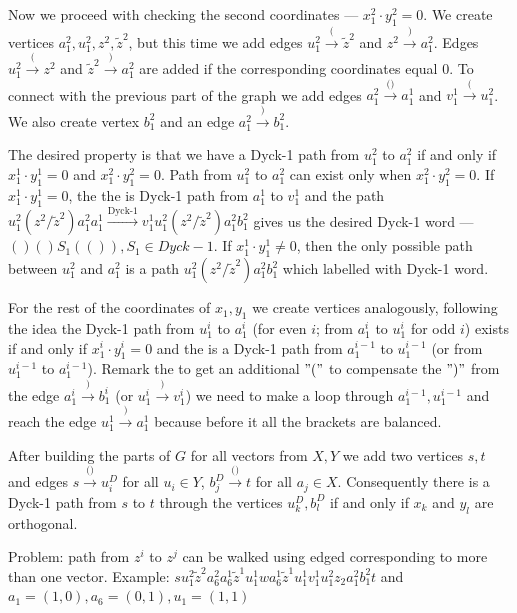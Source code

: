 \documentclass{amsart}
\begin{document}
	Now we proceed with checking the second coordinates --- $x_1^2 \cdot y_1^2 = 0$. We create vertices $a_1^2, u_1^2, z^2, \tilde{z}^2$, but this time we add edges $u_1^2 \xrightarrow{\text{(}} \tilde{z}^2$ and $z^2 \xrightarrow{\text{)}} a_1^2$. Edges $u_1^2 \xrightarrow{\text{(}} z^2$ and $\tilde{z}^2 \xrightarrow{\text{)}} a_1^2$ are added if the corresponding coordinates equal 0. To connect with the previous part of the graph we add edges $a_1^2 \xrightarrow{\text{()}} a_1^1$ and $v_1^1 \xrightarrow{\text{(}} u_1^2$. We also create vertex $b_1^2$ and an edge $a_1^2 \xrightarrow{\text{)}} b_1^2$. 
	
	The desired property is that we have a Dyck-1 path from $u_1^2$ to $a_1^2$ if and only if $x_1^1 \cdot y_1^1 = 0$ and $x_1^2 \cdot y_1^2 = 0$. Path from $u_1^2$ to $a_1^2$ can exist only when $x_1^2 \cdot y_1^2 = 0$. If $x_1^1 \cdot y_1^1 = 0$, the the is Dyck-1 path from $a_1^1$ to $v_1^1$ and the path $u_1^2(z^2/\tilde{z}^2)a_1^2a_1^1 \xrightarrow{\text{Dyck-1}} v_1^1 u_1^2(z^2/\tilde{z}^2)a_1^2b_1^2$ gives us the desired Dyck-1 word --- $()()S_1(()), S_1 \in Dyck-1$. If $x_1^1 \cdot y_1^1 \neq 0$, then the only possible path between $u_1^2$ and $a_1^2$ is a path $u_1^2(z^2/\tilde{z}^2)a_1^2b_1^2$ which labelled with Dyck-1 word.
	
	For the rest of the coordinates of $x_1, y_1$ we create vertices analogously, following the idea the Dyck-1 path from $u_1^i$ to $a_1^i$ (for even $i$; from $a_1^i$ to $u_1^i$ for odd $i$) exists if and only if $x_1^i \cdot y_1^i = 0$ and the is a Dyck-1 path from $a_1^{i - 1}$ to $u_1^{i - 1}$ (or from $u_1^{i - 1}$ to $a_1^{i - 1}$). Remark the to get an additional $"("$ to compensate the $")"$ from the edge $a_1^i \xrightarrow{\text{)}} b_1^i$ (or $u_1^i\xrightarrow{\text{)}} v_1^i$) we need to make a loop through $a_1^{i - 1}, u_1^{i - 1}$ and reach the edge $u_1^1 \xrightarrow{\text{)}} a_1^1$ because before it all the brackets are balanced.
	
	After building the parts of $G$ for all vectors from $X, Y$ we add two vertices $s, t$ and edges $s \xrightarrow{\text{()}} u_i^D$ for all $u_i \in Y$, $b_j^D \xrightarrow{\text{()}} t$ for all $a_j \in X$. Consequently there is a Dyck-1 path from $s$ to $t$ through the vertices $u_k^D, b_l^D$ if and only if $x_k$ and $y_l$ are orthogonal.
	
	{\color{red} Problem: path from $z^i$ to $z^j$ can be walked using edged corresponding to more than one vector. Example: $su_1^2\tilde{z}^2a_6^2a_6^1\tilde{z}^1u_1^1wa_6^1\tilde{z}^1u_1^1v_1^1u_1^2z_2a_1^2b_1^2t$ and $a_1 = (1, 0), a_6 = (0, 1), u_1 = (1, 1)$}
	
\end{document}
